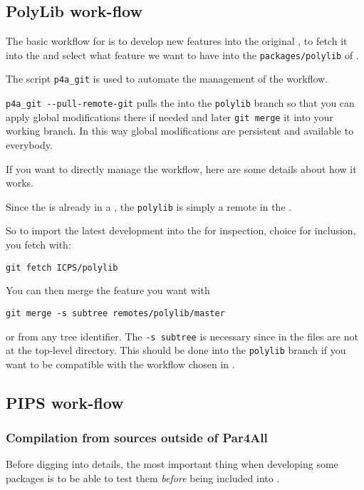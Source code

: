 \documentclass[a4paper]{article}
\begin{document}
\subsection{PolyLib work-flow}
\label{sec:polylib-workflow}

The basic workflow for \Apolylib is to develop new features into the
original \Apolylib{} \Agit, to fetch it into the \Apfa{} \Agit and select what
feature we want to have into the \texttt{packages/polylib} of \Apfa.

The script \verb|p4a_git| is used to automate the management of the
workflow.

\verb|p4a_git --pull-remote-git| pulls the \Apolylib into the
\texttt{polylib} branch so that you can apply global modifications there
if needed and later \texttt{git merge} it into your working branch. In
this way global modifications are persistent and available to everybody.

If you want to directly manage the \Apolylib workflow, here are some
details about how it works.

Since the \Apolylib is already in a \Agit, the \texttt{polylib} is simply
a remote in the \Apfa{} \Agit.

So to import the latest \Apolylib development into the \Apfa{} \Agit for
inspection, choice for inclusion, you fetch \Apolylib with:
\begin{verbatim}
git fetch ICPS/polylib
\end{verbatim}

You can then merge the feature you want with
\begin{verbatim}
git merge -s subtree remotes/polylib/master
\end{verbatim}
or from any tree identifier. The \texttt{-s subtree} is necessary since in
\Apfa the \Apolylib files are not at the top-level directory. This should
be done into the \texttt{polylib} branch if you want to be compatible with
the workflow chosen in \Apfa.


\subsection{PIPS work-flow}
\label{sec:pips-workflow}

\subsubsection{Compilation from sources outside of Par4All}
\label{sec:comp-from-sourc}

Before digging into details, the most important thing when developing some
\Apfa packages is to be able to test them \emph{before} being included
into \Apfa.
\end{document}

